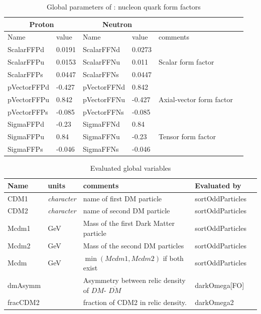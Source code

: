 \documentclass[12pt,a4paper]{article}
\begin{document}
\begin{table}[]
 \caption{Global parameters of \micro :  nucleon quark form factors}
 \label{FFTab}
\begin{center}
\begin{tabular}{|l|l|l|l|l|l|}
\hline
 \multicolumn{2}{|c|}{Proton}& \multicolumn{2}{|c|}{Neutron} & \\ \hline
  Name      &  value       &  Name      &  value     &  comments \\  \hline
ScalarFFPd  &  0.0191     &ScalarFFNd  &  0.0273  & \\
ScalarFFPu  &  0.0153     &ScalarFFNu  &  0.011 & Scalar form factor \\
ScalarFFPs  &  0.0447      &ScalarFFNs  &  0.0447   & \\
\hline
pVectorFFPd &  -0.427      &pVectorFFNd &  0.842    & \\
pVectorFFPu &   0.842      &pVectorFFNu &  -0.427   & Axial-vector form factor\\
pVectorFFPs &  -0.085      &pVectorFFNs &  -0.085   & \\
\hline
SigmaFFPd   &  -0.23       &SigmaFFNd   &  0.84     & \\
SigmaFFPu   &   0.84       &SigmaFFNu   &  -0.23    & Tensor form factor\\
SigmaFFPs   &   -0.046     &SigmaFFNs   &  -0.046   & \\
\hline
\end{tabular}
\end{center}
\end{table}

\begin{table}[htbp]
 \caption{Evaluated global  variables}
 \label{paramTabEval}
\begin{center}
\begin{tabular}{|l|l|l|l|l|}
\hline
  Name      & units          & comments                                       & Evaluated by      \\  \hline
  CDM1      &{\it character} & name of first DM particle                 & sortOddParticles  \\     
  CDM2      &{\it character} &  name of second  DM particle             & sortOddParticles  \\
  Mcdm1     &  GeV           & Mass of the first Dark Matter particle         & sortOddParticles  \\ 
  Mcdm2     &  GeV           & Mass of the second DM particles                & sortOddParticles  \\
  Mcdm      &  GeV           & $\min(Mcdm1,Mcdm2)$ if both exist              & sortOddParticles  \\
  dmAsymm   &                & Asymmetry between relic density of ${DM}$- $\overline{DM}$ & darkOmega[FO]\\
  fracCDM2  &                & fraction of CDM2 in relic density.             & darkOmega2\\
\hline
\end{tabular}
\end{center}
\end{table}
\end{document}

